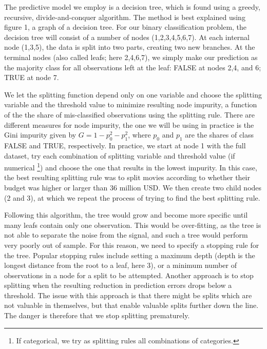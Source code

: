 \documentclass[
]{article}
\begin{document}
The predictive model we employ is a decision tree, which is found using
a greedy, recursive, divide-and-conquer algorithm. The method is best
explained using figure 1, a graph of a decision tree. For our binary
classification problem, the decision tree will consist of a number of
nodes (1,2,3,4,5,6,7). At each internal node (1,3,5), the data is split
into two parts, creating two new branches. At the terminal nodes (also
called leafs; here 2,4,6,7), we simply make our prediction as the
majority class for all observations left at the leaf: FALSE at nodes
2,4, and 6; TRUE at node 7.

We let the splitting function depend only on one variable and choose the
splitting variable and the threshold value to minimize resulting node
impurity, a function of the the share of mis-classified observations
using the splitting rule. There are different measures for node
impurity, the one we will be using in practice is the Gini impurity
given by \(G=1-p_0^2-p_1^2\), where \(p_0\) and \(p_1\) are the shares
of class FALSE and TRUE, respectively. In practice, we start at node 1
with the full dataset, try each combination of splitting variable and
threshold value (if numerical
\footnote{If categorical, we try as splitting rules all combinations of categories.})
and choose the one that results in the lowest impurity. In this case,
the best resulting splitting rule was to split movies according to
whether their budget was higher or larger than 36 million USD. We then
create two child nodes (2 and 3), at which we repeat the process of
trying to find the best splitting rule.

Following this algorithm, the tree would grow and become more specific
until many leafs contain only one observation. This would be
over-fitting, as the tree is not able to separate the noise from the
signal, and such a tree would perform very poorly out of sample. For
this reason, we need to specify a stopping rule for the tree. Popular
stopping rules include setting a maximum depth (depth is the longest
distance from the root to a leaf, here 3), or a minimum number of
observations in a node for a split to be attempted. Another approach is
to stop splitting when the resulting reduction in prediction errors
drops below a threshold. The issue with this approach is that there
might be splits which are not valuable in themselves, but that enable
valuable splits further down the line. The danger is therefore that we
stop splitting prematurely.
\end{document}
